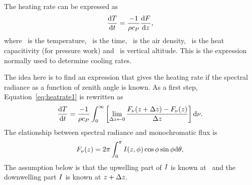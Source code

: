  The heating rate can be expressed as
 \begin{equation}
  \label{eq:heatrate1}
  \frac{\mathrm{d}T}{\mathrm{d}t} = 
         \frac{-1}{\rho c_{P}} \frac{\mathrm{d} F}{\mathrm{d}z},
 \end{equation}
 where \temperature\ is the temperature, \timesymbol\ is the time,
 \density\ is the air density, \heatcapacity\ is the heat capacitivity
 (for pressure work) and \altitude\ is vertical altitude. This is the
 expression normally used to determine cooling rates.

 The idea here is to find an expression that gives the heating rate if
 the spectral radiance as a function of zenith angle is known. 
 As a first step, Equation~\ref{eq:heatrate1} is rewritten as
 \begin{equation}
  \label{eq:heatrate2}
  \frac{\mathrm{d}T}{\mathrm{d}t} = 
        \frac{-1}{\rho c_{P}} \int_0^\infty \left[
        \lim_{\Delta z\gets 0}\frac{F_{\nu}(z+\Delta z)-
                F_{\nu}(z)}{\Delta z} \right] \mathrm{d}\nu.
 \end{equation}
 The elationship between spectral radiance and monochromatic
 flux is
 \begin{equation}
  F_{\nu}(z) = 2\pi\int_0^\pi I(z,\phi)
          \cos\phi \sin\phi \mathrm{d}\theta,
 \end{equation}
 The assumption below is that the upwelling part of $I$ is
 known at \altitude\, and the downwelling part $I$ is known at
 $z+\Delta z$.

